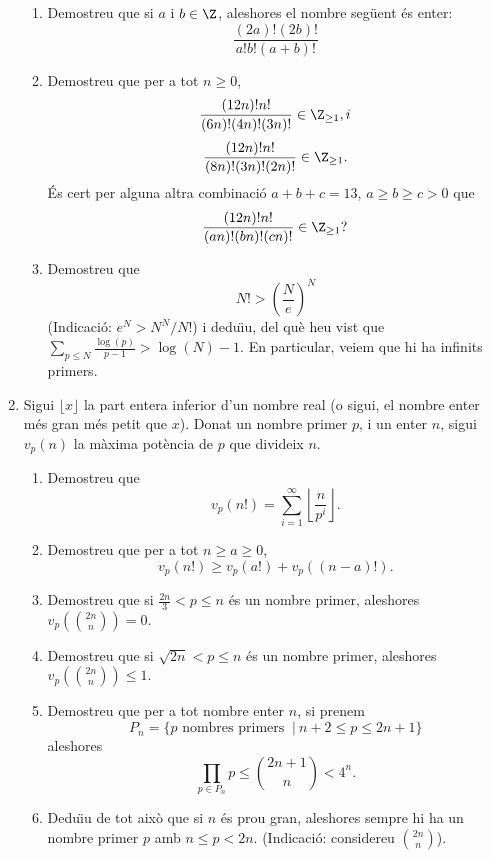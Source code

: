 \begin{enumerate}[leftmargin=*]
\begin{enumerate}
\item   Demostreu que si $a$ i $b\in\Z$, aleshores el nombre
seg\"{u}ent és enter: $$ \frac{(2a)!(2b)!}{a!b!(a+b)!}$$

\item Demostreu que per a tot $n\ge 0$,
  \[
    \frac {(12n)!n!}{(6n)!(4n)!(3n)!}\in\Z_{\ge 1}, i
  \]
  \[
    \frac {(12n)!n!}{(8n)!(3n)!(2n)!}\in\Z_{\ge 1}.
  \]
  És cert per alguna altra combinació $a+b+c=13$, $a\ge b\ge c>0$ que
  \[
    \frac {(12n)!n!}{(an)!(bn)!(cn)!}\in\Z_{\ge 1}?
  \]

\item  Demostreu que
  \[
    N!>\left( \frac {N}{e}\right)^N
  \]
  (Indicació: $e^N>N^N/N!$) i dedu\"{\i}u, del què heu vist que $\sum_{p\le
N} \frac{\log(p)}{p-1} > \log(N)-1$. En particular, veiem que hi ha infinits primers.
\end{enumerate}


\item Sigui $\lfloor x \rfloor$ la part entera inferior d'un
nombre real (o sigui, el nombre enter més gran més petit que $x$).
Donat un nombre primer $p$, i un enter $n$, sigui $v_p(n)$ la màxima
potència de $p$ que divideix $n$.

\begin{enumerate}


\item  Demostreu que $$v_p(n!)=\sum_{i=1}^{\infty} \left\lfloor
\frac n{p^i}\right\rfloor.$$

\item  Demostreu que per a tot $n\ge a\ge 0$,  $$v_p(n!)\ge
v_p(a!)+v_p((n-a)!).$$

\item  Demostreu que si  $\frac{2n}3< p\le n$ és un nombre
primer, aleshores $v_p(\binom{2n}{n})=0$.

\item  Demostreu que si  $\sqrt{2n}< p\le n$ és un nombre
primer, aleshores $v_p(\binom{2n}{n})\le 1$.

\item  Demostreu que per a tot nombre enter $n$, si prenem
\[
P_n=\{p \mbox{ nombres primers } \ | \ n+2\le p \le 2n+1\}
\]
aleshores
\[
\prod_{p\in P_n} p \le \binom{2n+1}{n}< 4^n.
\]

\item  Dedu\"{\i}u de tot això que si $n$ és prou gran,
aleshores sempre hi ha un nombre primer $p$ amb $n\le p<2n$.
(Indicació: considereu $\binom{2n}{n}$).

\end{enumerate}



\end{enumerate}
